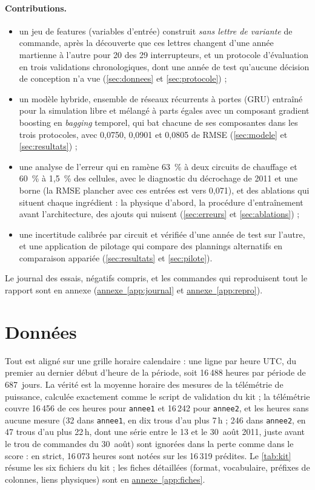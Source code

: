\documentclass[11pt,a4paper]{article}
\newcommand{\annexeref}[1]{\hyperref[#1]{annexe~\ref*{#1}}}
\begin{document}
\paragraph{Contributions.}
\begin{itemize}
  \item un jeu de features (variables d'entrée) construit \emph{sans lettre de variante} de commande, après la découverte que ces lettres changent d'une année martienne à l'autre pour 20 des 29 interrupteurs, et un protocole d'évaluation en trois validations chronologiques, dont une année de test qu'aucune décision de conception n'a vue (\autoref{sec:donnees} et \autoref{sec:protocole}) ;
  \item un modèle hybride, ensemble de réseaux récurrents à portes (GRU) \citep{cho2014gru} entraîné pour la simulation libre et mélangé à parts égales avec un composant gradient boosting en \emph{bagging} temporel, qui bat chacune de ses composantes dans les trois protocoles, avec 0,0750, 0,0901 et 0,0805 de RMSE (\autoref{sec:modele} et \autoref{sec:resultats}) ;
  \item une analyse de l'erreur qui en ramène 63~\% à deux circuits de chauffage et 60~\% à 1,5~\% des cellules, avec le diagnostic du décrochage de 2011 et une borne (la RMSE plancher avec ces entrées est vers 0,071), et des ablations qui situent chaque ingrédient : la physique d'abord, la procédure d'entraînement avant l'architecture, des ajouts qui nuisent (\autoref{sec:erreurs} et \autoref{sec:ablations}) ;
  \item une incertitude calibrée par circuit et vérifiée d'une année de test sur l'autre, et une application de pilotage qui compare des plannings alternatifs en comparaison appariée (\autoref{sec:resultats} et \autoref{sec:pilote}).
\end{itemize}
Le journal des essais, négatifs compris, et les commandes qui reproduisent tout le rapport sont en annexe (\annexeref{app:journal} et \annexeref{app:repro}).

\section{Données}\label{sec:donnees}

Tout est aligné sur une grille horaire calendaire : une ligne par heure UTC, du premier au dernier début d'heure de la période, soit 16\,488 heures par période de 687~jours. La vérité est la moyenne horaire des mesures de la télémétrie de puissance, calculée exactement comme le script de validation du kit ; la télémétrie couvre 16\,456 de ces heures pour \texttt{annee1} et 16\,242 pour \texttt{annee2}, et les heures sans aucune mesure (32 dans \texttt{annee1}, en dix trous d'au plus 7\,h ; 246 dans \texttt{annee2}, en 47 trous d'au plus 22\,h, dont une série entre le 13 et le 30~août 2011, juste avant le trou de commandes du 30~août) sont ignorées dans la perte comme dans le score : en strict, 16\,073 heures sont notées sur les 16\,319 prédites. Le \autoref{tab:kit} résume les six fichiers du kit ; les fiches détaillées (format, vocabulaire, préfixes de colonnes, liens physiques) sont en \annexeref{app:fiches}.
\end{document}

